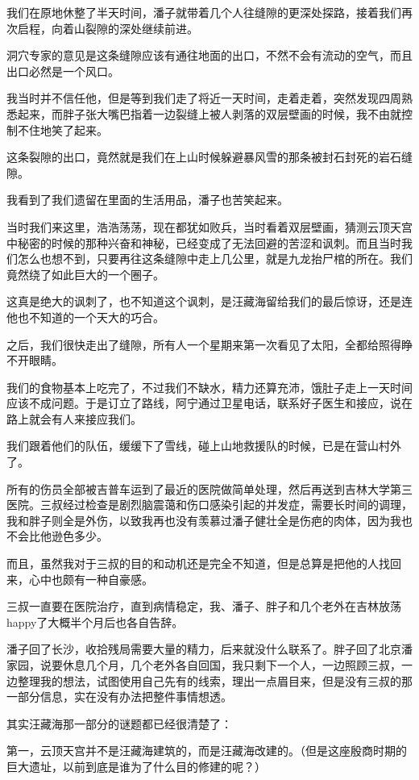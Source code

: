 我们在原地休整了半天时间，潘子就带着几个人往缝隙的更深处探路，接着我们再次启程，向着山裂隙的深处继续前进。

洞穴专家的意见是这条缝隙应该有通往地面的出口，不然不会有流动的空气，而且出口必然是一个风口。

我当时并不信任他，但是等到我们走了将近一天时间，走着走着，突然发现四周熟悉起来，而胖子张大嘴巴指着一边裂缝上被人剥落的双层壁画的时候，我不由就控制不住地笑了起来。

这条裂隙的出口，竟然就是我们在上山时候躲避暴风雪的那条被封石封死的岩石缝隙。

我看到了我们遗留在里面的生活用品，潘子也苦笑起来。

当时我们来这里，浩浩荡荡，现在都犹如败兵，当时看着双层壁画，猜测云顶天宫中秘密的时候的那种兴奋和神秘，已经变成了无法回避的苦涩和讽刺。而且当时我们怎么也想不到，只要再往这条缝隙中走上几公里，就是九龙抬尸棺的所在。我们竟然绕了如此巨大的一个圈子。

这真是绝大的讽刺了，也不知道这个讽刺，是汪藏海留给我们的最后惊讶，还是连他也不知道的一个天大的巧合。

之后，我们很快走出了缝隙，所有人一个星期来第一次看见了太阳，全都给照得睁不开眼睛。

我们的食物基本上吃完了，不过我们不缺水，精力还算充沛，饿肚子走上一天时间应该不成问题。于是订立了路线，阿宁通过卫星电话，联系好子医生和接应，说在路上就会有人来接应我们。

我们跟着他们的队伍，缓缓下了雪线，碰上山地救援队的时候，已是在营山村外了。

所有的伤员全部被吉普车运到了最近的医院做简单处理，然后再送到吉林大学第三医院。三叔经过检查是剧烈脑震蔼和伤口感染引起的并发症，需要长时间的调理，我和胖子则全是外伤，以致我再也没有羡慕过潘子健壮全是伤疤的肉体，因为我也不会比他逊色多少。

而且，虽然我对于三叔的目的和动机还是完全不知道，但是总算是把他的人找回来，心中也颇有一种自豪感。

三叔一直要在医院治疗，直到病情稳定，我、潘子、胖子和几个老外在吉林放荡happy了大概半个月后也各自告辞。

潘子回了长沙，收拾残局需要大量的精力，后来就没什么联系了。胖子回了北京潘家园，说要休息几个月，几个老外各自回国，我只剩下一个人，一边照顾三叔，一边整理我的想法，试图使用自己先有的线索，理出一点眉目来，但是没有三叔的那一部分信息，实在没有办法把整件事情想透。

其实汪藏海那一部分的谜题都已经很清楚了：

第一，云顶天宫并不是汪藏海建筑的，而是汪藏海改建的。（但是这座殷商时期的巨大遗址，以前到底是谁为了什么目的修建的呢？）

